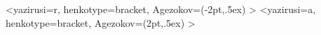%
  \HenKo<yazirusi=r,%
    henkotype=bracket,%
    Agezokov={(-2pt,.5ex)}%
    >\Li\Liv{}
  \HenKo<yazirusi=a,%
    henkotype=bracket,%
    Agezokov={(2pt,.5ex)}%
    >\Riv\Ri{}
